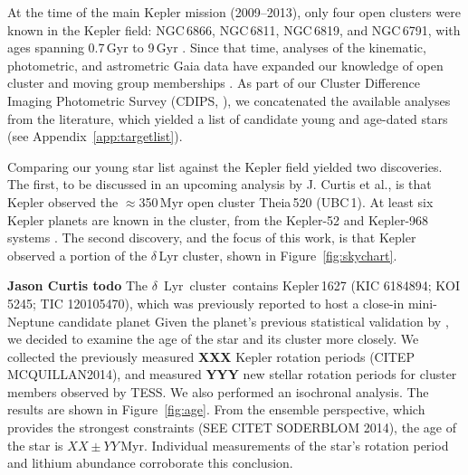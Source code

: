 \documentclass[12pt,modern,tighten]{aastex63}
\newcommand{\cn}{$\delta$~Lyr\ cluster} %
\begin{document}
At the time of the main Kepler mission (2009--2013), only four open
clusters were known in the Kepler field: NGC\,6866, NGC\,6811,
NGC\,6819, and NGC\,6791, with ages spanning 0.7\,Gyr to 9\,Gyr
\citep{meibom_kepler_2011}.  Since that time, analyses of the
kinematic, photometric, and astrometric Gaia data have expanded our
knowledge of open cluster and moving group memberships \citep[{\it
e.g.},][]{cantatgaudin_gaia_2018,zari_3d_2018,kounkel_untangling_2019,Meingast2021}.
As part of our Cluster Difference Imaging Photometric Survey (CDIPS,
\citealt{bouma_cdipsI_2019}), we concatenated the available analyses
from the literature, which yielded a list of candidate young and
age-dated stars (see Appendix~\ref{app:targetlist}).

Comparing our young star list against the Kepler field yielded two
discoveries.  The first, to be discussed in an upcoming analysis by J.
Curtis et al{.}, is that Kepler observed the $\approx$350\,Myr open
cluster Theia\,520 (UBC\,1).  At least six Kepler planets are known in
the cluster, from the Kepler-52 and Kepler-968 systems
\citep{rowe_validation_2014,jontof-hutter_following_2021}.  The second
discovery, and the focus of this work, is that Kepler observed a
portion of the $\delta$\,Lyr cluster, shown in
Figure~\ref{fig:skychart}.

{\bf Jason Curtis todo}
The \cn\ contains
Kepler\,1627 (KIC 6184894; KOI 5245; TIC 120105470), which 
was previously reported to host a close-in mini-Neptune candidate planet
\citep{2012ApJS..199...24T,thompson_planetary_2018}
Given the planet's previous statistical validation by
\citet{morton_false_2016}, we decided to examine the age of the star
and its cluster more closely.  We collected the previously measured
{\bf XXX} Kepler rotation periods (CITEP MCQUILLAN2014), and measured
{\bf YYY} new stellar rotation periods for cluster members observed by
TESS.  We also performed an isochronal analysis.  The results are
shown in Figure~\ref{fig:age}.  From the ensemble perspective, which
provides the strongest constraints (SEE CITET SODERBLOM 2014), the age
of the star is $XX \pm YY$\,Myr.  Individual measurements of the
star's rotation period and lithium abundance corroborate this
conclusion.

\end{document}
